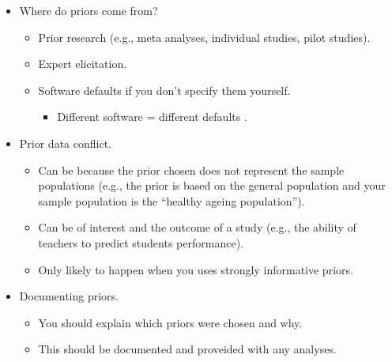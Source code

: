 \documentclass[
  a4paper,
  DIV=11,
  numbers=noendperiod]{scrreprt}
\providecommand{\tightlist}{%
  \setlength{\itemsep}{0pt}\setlength{\parskip}{0pt}}\usepackage{longtable,booktabs,array}
\begin{document}
\begin{itemize}
  \begin{itemize}
  \tightlist
  \item
    Priors need be specified before looking at the data as they will
    influence the results of any analyses.
  \item
    Strongly informative priors will result in a \emph{prior driven
    posterior} where the results will be closer to the prior than the
    likelihood.
  \item
    Weakly informative priors will result in a \emph{data driven
    posterior} where the reuslts will be close to the likelihood than
    the prior.
  \item
    Sample size is also important, the larger the sample, the larger the
    influce of the likelihood on the posterior.
  \item
    https://www.rensvandeschoot.com/fbi-the-app/
  \end{itemize}
\item
  Where do priors come from?

  \begin{itemize}
  \tightlist
  \item
    Prior research (e.g., meta analyses, individual studies, pilot
    studies).
  \item
    Expert elicitation.
  \item
    Software defaults if you don't specify them yourself.

    \begin{itemize}
    \tightlist
    \item
      Different software = different defaults \citep{vanErp2018}.
    \end{itemize}
  \end{itemize}
\item
  Prior data conflict.

  \begin{itemize}
  \tightlist
  \item
    Can be because the prior chosen does not represent the sample
    populations (e.g., the prior is based on the general population and
    your sample population is the ``healthy ageing population'').
  \item
    Can be of interest and the outcome of a study (e.g., the ability of
    teachers to predict students performance).
  \item
    Only likely to happen when you uses strongly informative priors.
  \end{itemize}
\item
  Documenting priors.

  \begin{itemize}
  \tightlist
  \item
    You should explain which priors were chosen and why.
  \item
    This should be documented and proveided with any analyses.
  \end{itemize}
\end{itemize}
\end{document}
